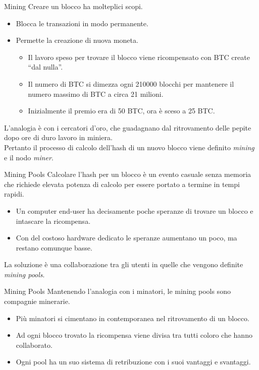 \documentclass[italian]{beamer}
\begin{document}
\begin{frame}{Mining}
Creare un blocco ha molteplici scopi.
\pause
\begin{itemize}
  \item Blocca le transazioni in modo permanente.
  \item Permette la creazione di nuova moneta.
  \begin{itemize}
    \item Il lavoro speso per trovare il blocco viene ricompensato con BTC create ``dal nulla''.
    \item Il numero di BTC si dimezza ogni 210000 blocchi per mantenere il numero massimo di BTC a circa 21 milioni.
    \item Inizialmente il premio era di 50 BTC, ora è sceso a 25 BTC.
  \end{itemize}
\end{itemize}
\bigskip
\pause L'analogia è con i cercatori d'oro, che guadagnano dal ritrovamento delle pepite dopo ore di duro lavoro in miniera. \\
\pause Pertanto il processo di calcolo dell'hash di un nuovo blocco viene definito \emph{mining} e il nodo \emph{miner}.
\end{frame}

\begin{frame}{Mining Pools}
  Calcolare l'hash per un blocco è un evento casuale senza memoria che richiede elevata potenza di calcolo per essere portato a termine in tempi rapidi.
 \begin{itemize}
  \item Un computer end-user ha decisamente poche speranze di trovare un blocco e intascare la ricompensa.
  \item Con del costoso hardware dedicato le speranze aumentano un poco, ma restano comunque basse.
 \end{itemize}
 \bigskip
 \pause La soluzione è una collaborazione tra gli utenti in quelle che vengono definite \emph{mining pools}.
\end{frame}

\begin{frame}{Mining Pools}
  Mantenendo l'analogia con i minatori, le mining pools sono compagnie minerarie.
 \begin{itemize}
  \item Più minatori si cimentano in contemporanea nel ritrovamento di un blocco.
  \item Ad ogni blocco trovato la ricompensa viene divisa tra tutti coloro che hanno collaborato.
  \item Ogni pool ha un suo sistema di retribuzione con i suoi vantaggi e svantaggi.
 \end{itemize}
\end{frame}
\end{document}
